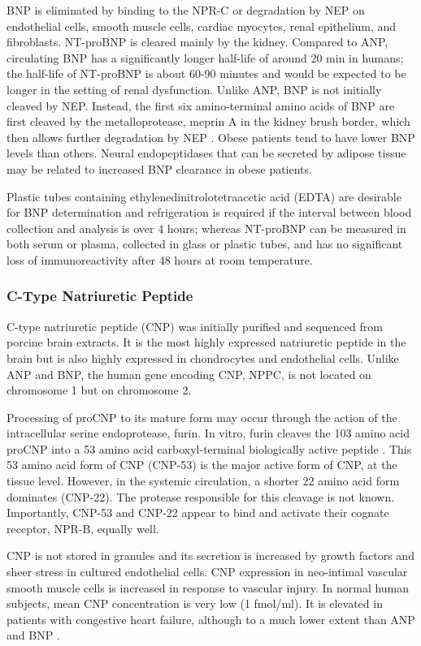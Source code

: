\documentclass[14pt,a4paper,onecolumn]{extarticle}
\begin{document}
BNP is eliminated by binding to the NPR-C or degradation by NEP on endothelial cells, smooth muscle cells, cardiac myocytes, renal epithelium, and fibroblasts. NT-proBNP is cleared mainly by the kidney. Compared to ANP, circulating BNP has a significantly longer half-life of around 20 min in humans; the half-life of NT-proBNP is about 60-90 minutes and would be expected to be longer in the setting of renal dysfunction. Unlike ANP, BNP is not initially cleaved by NEP. Instead, the first six amino-terminal amino acids of BNP are first cleaved by the metalloprotease, meprin A in the kidney brush border, which then allows further degradation by NEP \citep{Pankow2007}. Obese patients tend to have lower BNP levels than others. Neural endopeptidases that can be secreted by adipose tissue may be related to increased BNP clearance in obese patients.\citep{Yang2004}

Plastic tubes containing ethylenedinitrolotetraacetic acid (EDTA) are desirable for BNP determination and refrigeration is required if the interval between blood collection and analysis is over 4 hours; whereas NT-proBNP can be measured in both serum or plasma, collected in glass or plastic tubes, and has no significant loss of immunoreactivity after 48 hours at room temperature. \citep{Omland2008}

\subsubsection{C-Type Natriuretic Peptide}
C-type natriuretic peptide (CNP) was initially purified and sequenced from porcine brain extracts. It is the most highly expressed natriuretic peptide in the brain but is also highly expressed in chondrocytes and endothelial cells. Unlike ANP and BNP, the human gene encoding CNP, NPPC, is not located on chromosome 1 but on chromosome 2.

Processing of proCNP to its mature form may occur through the action of the intracellular serine endoprotease, furin. In vitro, furin cleaves the 103 amino acid proCNP into a 53 amino acid carboxyl-terminal biologically active peptide \citep{Wu2003a}. This 53 amino acid form of CNP (CNP-53) is the major active form of CNP, at the tissue level. However, in the systemic circulation, a shorter 22 amino acid form dominates (CNP-22). The protease responsible for this cleavage is not known. Importantly, CNP-53 and CNP-22 appear to bind and activate their cognate receptor, NPR-B, equally well.

CNP is not stored in granules and its secretion is increased by growth factors and sheer stress in cultured endothelial cells. CNP expression in neo-intimal vascular smooth muscle cells is increased in response to vascular injury. In normal human subjects, mean CNP concentration is very low (1 fmol/ml). It is elevated in patients with congestive heart failure, although to a much lower extent than ANP and BNP \citep{Charles2006} \citep{Del-Ry2005} \citep{Kalra2003}.
\end{document}
